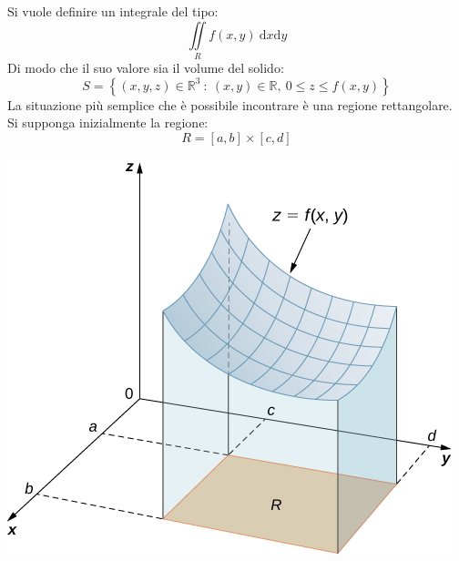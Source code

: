 \documentclass[a4paper]{article}
\begin{document}
	Si vuole definire un integrale del tipo:
	\begin{equation*}
		\displaystyle\iint\limits_{R} f\left(x,y\right) \:\mathrm{d}x\mathrm{d}y
	\end{equation*}
	Di modo che il suo valore sia il volume del solido:
	\begin{equation*}
		S = \left\{\left(x,y,z\right) \in \mathbb{R}^{3} \: : \: \left(x,y\right) \in \mathbb{R}, \: 0 \le z \le f\left(x,y\right)\right\}
	\end{equation*}
	La situazione più semplice che è possibile incontrare è una regione rettangolare. Si supponga inizialmente la regione:
	\begin{equation*}
		R = \left[a, b\right] \times \left[c,d\right]
	\end{equation*}
	\begin{minipage}{.5\textwidth}
		\centering
		\includegraphics[width=\textwidth]{img/integrali-doppi-rettangolo.jpg}
	\end{minipage}
\end{document}
